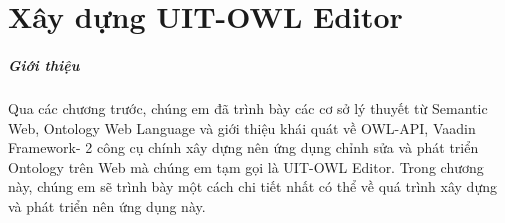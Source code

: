 \chapter{Xây dựng UIT-OWL Editor}
\paragraph{Giới thiệu} Qua các chương trước, chúng em đã trình bày các cơ sở lý thuyết từ Semantic Web, Ontology Web Language và giới thiệu khái quát về OWL-API, Vaadin Framework- 2 công cụ chính xây dựng nên ứng dụng chỉnh sửa và phát triển Ontology trên Web mà chúng em tạm gọi là UIT-OWL Editor. Trong chương này, chúng em sẽ trình bày một cách chi tiết nhất có thể về quá trình xây dựng và phát triển nên ứng dụng này.
\